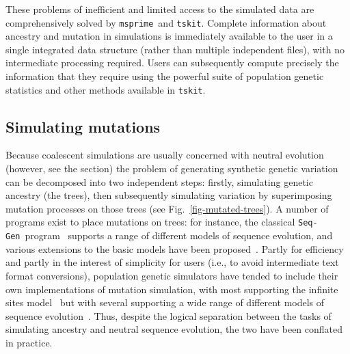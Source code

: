 \documentclass{article}
\newcommand{\msprime}[0]{\texttt{msprime}}
\newcommand{\tskit}[0]{\texttt{tskit}}
\newcommand{\SeqGen}[0]{\texttt{Seq-Gen}}
\begin{document}
These problems of inefficient and limited access to the simulated
data are comprehensively solved by \msprime\ and \tskit. Complete
information about ancestry and mutation in simulations is immediately
available to the user in a single integrated data structure
(rather than multiple independent files), with no intermediate
processing required.
Users can subsequently compute precisely the information that they
require using the powerful suite of population genetic statistics
and other methods available in \tskit.

\subsection*{Simulating mutations}
\label{sec-mutations}

Because coalescent simulations are usually concerned with
neutral evolution (however, see the  section)
the problem of generating synthetic genetic variation can be decomposed into
two independent steps:
firstly, simulating genetic ancestry (the trees), then subsequently simulating
variation by superimposing mutation processes on those trees
(see Fig.~\ref{fig-mutated-trees}).
A number of programs exist to place mutations on trees: for instance,
the classical \SeqGen\ program~\citep{rambaut1997seq}
supports a range of different models of sequence evolution,
and various extensions to the basic
models have been proposed~\citep[e.g.][]{cartwright2005dna,fletcher2009indelible}.
Partly for efficiency and partly in the interest of
simplicity for users (i.e., to avoid intermediate text format conversions),
population genetic simulators have tended to
include their own implementations of mutation simulation, with
most supporting the infinite sites
model~\citep[e.g.][]{hudson2002generating}
but with several supporting a wide range of different models of sequence
evolution~\citep[e.g.][]{mailund2005coasim,excoffier2011fastsimcoal,
virgoulay2021gspace}. Thus, despite the logical separation between
the tasks of simulating ancestry and neutral sequence evolution,
the two have been conflated in practice.
\end{document}

